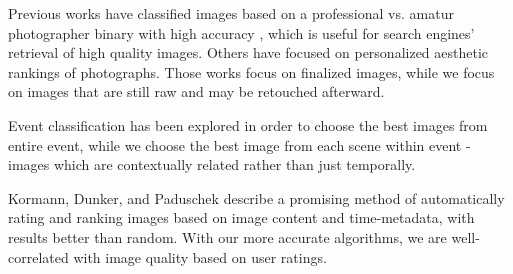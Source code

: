 \documentclass{article}
\begin{document}
Previous works have classified images based on a professional vs. amatur photographer binary with high accuracy\cite{1640788} \cite{springerlink:10.1007/11744078_23}\cite{springerlink:10.1007/978-3-540-88690-7_29}, which is useful for search engines' retrieval of high quality images. Others have focused on personalized aesthetic rankings of photographs\cite {Sun:2009:PAB:1631272.1631351}\cite {Yeh:2010:PPR:1873951.1873963}. Those works focus on finalized images, while we focus on images that are still raw and may be retouched afterward.

Event classification has been explored in order to choose the best images from entire event\cite{1223566}\cite{4444209}, while we choose the best image from each scene within event - images which are contextually related rather than just temporally.

Kormann, Dunker, and Paduschek\cite{springerlink:10.1007/978-3-642-10543-2_23} describe a promising method of automatically rating and ranking images based on image content and time-metadata, with results better than random. With our more accurate algorithms, we are well-correlated with image quality based on user ratings.




\end{document}
